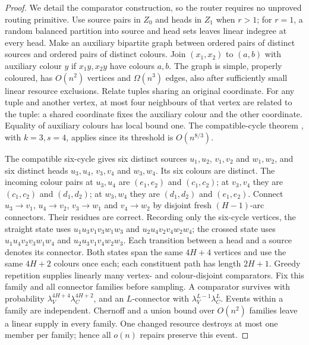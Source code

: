 \begin{proof}
We detail the comparator construction, so the router requires no
unproved routing primitive. Use source pairs in $Z_0$ and heads in $Z_1$ when $r>1$; for $r=1$, a random balanced partition into source and head sets leaves linear indegree at every head. Make an auxiliary
bipartite graph between ordered pairs of distinct sources and ordered
pairs of distinct colours. Join $(x_1,x_2)$ to $(a,b)$ with auxiliary colour $y$ if $x_1y,x_2y$ have colours $a,b$. The graph is simple, properly coloured, has $O(n^2)$ vertices and $\Omega(n^3)$ edges, also after sufficiently small linear resource exclusions.
Relate tuples sharing an original coordinate. For any tuple and
another vertex, at most four neighbours of that vertex are related
to the tuple: a shared coordinate fixes the auxiliary colour and
the other coordinate. Equality of auxiliary colours has local bound
one. The compatible-cycle theorem \cite[Theorem 3.4]{BMMP}, with $k=3,s=4$, applies since its threshold is $O(n^{8/3})$.

The compatible six-cycle gives six distinct sources $u_1,u_2$, $v_1,v_2$ and $w_1,w_2$, and six distinct heads $u_3,u_4$, $v_3,v_4$ and $w_3,w_4$. Its six colours are distinct. The incoming colour pairs at $u_3,u_4$ are $(e_1,e_2)$ and $(c_1,c_2)$; at $v_3,v_4$ they are $(c_1,c_2)$ and $(d_1,d_2)$; at $w_3,w_4$ they are $(d_1,d_2)$ and $(e_1,e_2)$. Connect $u_3\to{}v_1$, $u_4\to{}v_2$, $v_3\to{}w_1$ and $v_4\to{}w_2$ by disjoint fresh $(H-1)$-arc connectors. Their residues are correct. Recording only the six-cycle vertices, the straight state uses $u_1u_3v_1v_3w_1w_3$ and $u_2u_4v_2v_4w_2w_4$; the crossed state uses $u_1u_4v_2v_3w_1w_4$ and $u_2u_3v_1v_4w_2w_3$. Each transition between a head and a source denotes its connector.
Both states span the same $4H+4$ vertices and use the same $4H+2$ colours once each; each constituent path has length $2H+1$. Greedy repetition supplies linearly many vertex- and colour-disjoint
comparators. Fix this family and all connector families before sampling.
A comparator survives with probability $\lambda_V^{4H+4}\lambda_C^{4H+2}$, and an $L$-connector with $\lambda_V^{L-1}\lambda_C^L$. Events within a family are independent. Chernoff and a union bound over $O(n^2)$ families leave a linear supply in every family. One changed resource destroys at most one
member per family; hence all $o(n)$ repairs preserve this event.


\end{proof}
